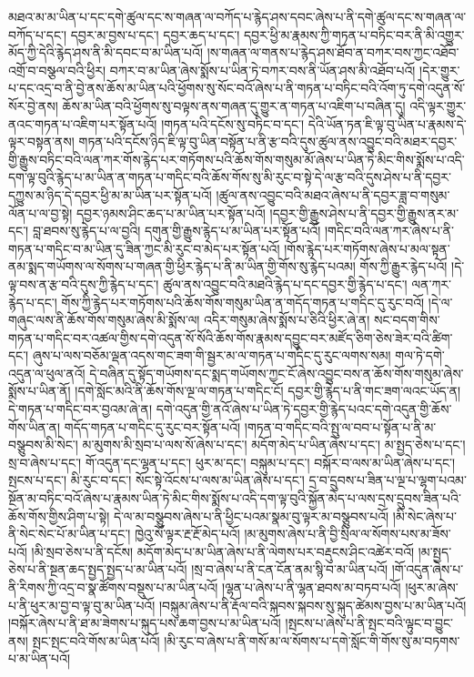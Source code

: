 མཐའ་མ་མ་ཡིན་པ་དང་དགེ་ཚུལ་དང་ས་གཞན་ལ་བཀོད་པ་རྙེད་ཤས་དབང་ཞེས་པ་ནི་དགེ་ཚུལ་དང་ས་གཞན་ལ་བཀོད་པ་དང་། དབྱར་མ་བྱས་པ་དང་། དབྱར་ཆད་པ་དང་། དབྱར་ཕྱི་མ་རྣམས་ཀྱི་གཏན་པ་བཏིང་བར་ནི་མི་འགྱུར་མོད་ཀྱི་དེའི་རྙེད་ཤས་ནི་མི་དབང་བ་མ་ཡིན་པའོ། །ས་གཞན་ལ་གནས་པ་རྙེད་ཤས་ཐོབ་ན་བཀར་བས་ཀྱང་འཐོབ་འགྲོ་བ་བསྩལ་བའི་ཕྱིར། བཀར་བ་མ་ཡིན་ཞེས་སྨོས་པ་ཡིན་ཏེ་བཀར་བས་ནི་ཡོན་ཤས་མི་འཐོབ་པའོ། །དེར་གྱུར་པ་དང་འདྲ་བ་ནི་བྱེ་ནས་ཆོས་མ་ཡིན་པའི་ཕྱོགས་སུ་སོང་བའོ་ཞེས་པ་ནི་གཏན་པ་བཏིང་བའི་འོག་ཏུ་དགེ་འདུན་སོ་སོར་བྱེ་ནས། ཆོས་མ་ཡིན་བའི་ཕྱོགས་སུ་བལྟས་ནས་གཞན་དུ་གྱུར་ན་གཏན་པ་འཇིག་པ་བཞིན་དུ། འདི་ལྟར་གྱུར་ནའང་གཏན་པ་འཇིག་པར་སྟོན་པའོ། །གཏན་པའི་དངོས་སུ་བཏིང་བ་དང་། དེའི་ཡོན་ཏན་ཇི་ལྟ་བུ་ཡིན་པ་རྣམས་དེ་ལྟར་བསྟན་ནས། གཏན་པའི་དངོས་ཉིད་ཇི་ལྟ་བུ་ཡིན་བསྟོན་པ་ནི་རྩ་བའི་དུས་ཚུལ་ནས་འབྱུང་བའི་མཐར་དབྱར་གྱི་རྒྱུས་བཏིང་བའི་ལན་ཀར་གོས་རྙེད་པར་གཏོགས་པའི་ཆོས་གོས་གསུམ་མོ་ཞེས་པ་ཡིན་ཏེ་མིང་གིས་སྨོས་པ་འདི་དག་ལྟ་བུའི་རྙེད་པ་མ་ཡིན་ན་གཏན་པ་གདིང་བའི་ཆོས་གོས་སུ་མི་རུང་བ་སྟེ་དེ་ལ་རྩ་བའི་དུས་ཤེས་པ་ནི་དབྱར་དཀྱུས་མ་ཉིད་དེ་དབྱར་ཕྱི་མ་མ་ཡིན་པར་སྟོན་པའོ། །ཚུལ་ནས་འབྱུང་བའི་མཐའ་ཞེས་པ་ནི་དབྱར་ཟླ་བ་གསུམ་ལོན་པ་ལ་བྱ་སྟེ། དབྱར་ཉམས་ཤིང་ཆད་པ་མ་ཡིན་པར་སྟོན་པའོ། །དབྱར་གྱི་རྒྱུས་ཤེས་པ་ནི་དབྱར་གྱི་རྒྱུས་ནར་མ་དང་། བླ་ཐབས་སུ་རྙེད་པ་ལ་བྱའི། དགུན་གྱི་རྒྱུས་རྙེད་པ་མ་ཡིན་པར་སྟོན་པའོ། །གདིང་བའི་ལན་ཀར་ཞེས་པ་ནི་གཏན་པ་གདིང་བ་མ་ཡིན་དུ་ཟིན་ཀྱང་མི་རུང་བ་མེད་པར་སྟོན་པའོ། །གོས་རྙེད་པར་གཏོགས་ཞེས་པ་མལ་སྟན་ནམ་སྨད་གཡོགས་ལ་སོགས་པ་གཞན་གྱི་ཕྱིར་རྙེད་པ་ནི་མ་ཡིན་གྱི་གོས་སུ་རྙེད་པའམ། གོས་ཀྱི་རྒྱུར་རྙེད་པའོ། །དེ་ལྟ་བས་ན་རྩ་བའི་དུས་ཀྱི་རྙེད་པ་དང་། ཚུལ་ནས་འབྱུང་བའི་མཐའི་རྙེད་པ་དང་དབྱར་གྱི་རྙེད་པ་དང་། ལན་ཀར་རྙེད་པ་དང་། གོས་ཀྱི་རྙེད་པར་གཏོགས་པའི་ཆོས་གོས་གསུམ་ཡིན་ན་གདོད་གཏན་པ་གདིང་དུ་རུང་བའོ། །དེ་ལ་གཞུང་ལས་ནི་ཆོས་གོས་གསུམ་ཞེས་མི་སྨོས་ལ། འདིར་གསུམ་ཞེས་སྨོས་པ་ཅིའི་ཕྱིར་ཞེ་ན། སང་བདག་གིས་གཏན་པ་གདིང་བར་འཚལ་གྱིས་དགེ་འདུན་སོ་སོའི་ཆོས་གོས་རྣམས་དབྱུང་བར་མཛོད་ཅིག་ཅེས་ཟེར་བའི་ཚིག་དང་། ཞུས་པ་ལས་བཅོམ་ལྡན་འདས་གང་ཟག་གི་སྦྱར་མ་ལ་གཏན་པ་གདིང་དུ་རུང་ལགས་སམ། གལ་ཏེ་དགེ་འདུན་ལ་ཕུལ་ནའོ། དེ་བཞིན་དུ་སྟོད་གཡོགས་དང་སྨད་གཡོགས་ཀྱང་ངོ་ཞེས་འབྱུང་བས་ན་ཆོས་གོས་གསུམ་ཞེས་སྨོས་པ་ཡིན་ནོ། །དགེ་སློང་མའི་ནི་ཆོས་གོས་ལྔ་ལ་གཏན་པ་གདིང་ངོ། དབྱར་གྱི་རྙེད་པ་ནི་གང་ཟག་ལའང་ཡོད་ན། དེ་གཏན་པ་གདིང་བར་བྱའམ་ཞེ་ན། དགེ་འདུན་གྱི་ནའོ་ཞེས་པ་ཡིན་ཏེ་དབྱར་གྱི་རྙེད་པའང་དགེ་འདུན་གྱི་ཆོས་གོས་ཡིན་ན། གདོད་གཏན་པ་གདིང་དུ་རུང་བར་སྟོན་པའོ། །གཏན་བ་གདིང་བའི་སྤུ་ལ་བབ་པ་སྟོན་པ་ནི་མ་བསྩུབས་མི་སེང་། མ་མུགས་མི་སྲབ་པ་ལས་སོ་ཞེས་པ་དང་། མདོག་མེད་པ་ཡིན་ཞེས་པ་དང་། མ་སྤྱད་ཅེས་པ་དང་། སྲ་བ་ཞེས་པ་དང་། གོ་འདུན་དང་ལྷན་པ་དང་། ཕུར་མ་དང་། བསྐུམ་པ་དང་། བསྐོར་བ་ལས་མ་ཡིན་ཞེས་པ་དང་། སྤངས་པ་དང་། མི་རུང་བ་དང་། སོང་སྟེ་འོངས་པ་ལས་མ་ཡིན་ཞེས་པ་དང་། དྲ་བ་དྲུབས་པ་ཟིན་པ་ལྔ་པ་ལྷག་པའམ་སྔོན་མ་བཏིང་བའོ་ཞེས་པ་རྣམས་ཡིན་ཏེ་མིང་གིས་སྨོས་པ་འདི་དག་ལྟ་བུའི་སྐྱོན་མེད་པ་ལས་དྲས་དྲུབས་ཟིན་པའི་ཆོས་གོས་གྱིས་ཤིག་པ་སྟེ། དེ་ལ་མ་བསྩུབས་ཞེས་པ་ནི་ཕྱིང་པའམ་སྣམ་བུ་ལྟར་མ་བསྩུབས་པའོ། །མི་སེང་ཞེས་པ་ནི་སེང་སེང་པོ་མ་ཡིན་པ་དང་། ཁྱེའུ་སོ་ལྟར་རྔ་རྔོ་མེད་པའོ། །མ་མུགས་ཞེས་པ་ནི་བྱི་སྲིལ་ལ་སོགས་པས་མ་ཟོས་པའོ། །མི་སྲབ་ཅེས་པ་ནི་དངོས། མདོག་མེད་པ་མ་ཡིན་ཞེས་པ་ནི་ལེགས་པར་བརྡུངས་ཤིང་འཚེར་བའོ། །མ་སྤྱད་ཅེས་པ་ནི་སྔན་ཆད་སྤྱད་སྤྱད་པ་མ་ཡིན་པའོ། །སྲ་བ་ཞེས་པ་ནི་ངན་ངོན་ནམ་སྙི་བ་མ་ཡིན་པའོ། །གོ་འདུན་ཞེས་པ་ནི་རིགས་ཀྱི་འདྲ་བ་སྣ་ཚོགས་བསྡུས་པ་མ་ཡིན་པའོ། །ལྷན་པ་ཞེས་པ་ནི་ལྷན་ཐབས་མ་བཏབ་པའོ། །ཕུར་མ་ཞེས་པ་ནི་ཕུར་མ་བྱ་བ་ལྟ་བུ་མ་ཡིན་པའོ། །བསྐུམ་ཞེས་པ་ནི་རྡོལ་བའི་སྐབས་སྐབས་སུ་སྐུད་ཚེམས་བྱས་པ་མ་ཡིན་པའོ། །བསྐོར་ཞེས་པ་ནི་ཐ་མ་ཟེགས་པ་སྐུད་པས་ཆག་བྱས་པ་མ་ཡིན་པའོ། །སྤངས་པ་ཞེས་པ་ནི་སྤང་བའི་ལྟུང་བ་བྱུང་ནས། སྤང་སྤང་བའི་གོས་མ་ཡིན་པའོ། །མི་རུང་བ་ཞེས་པ་ནི་གསོ་མ་ལ་སོགས་པ་དགེ་སློང་གི་གོས་སུ་མ་བཏགས་པ་མ་ཡིན་པའོ། 